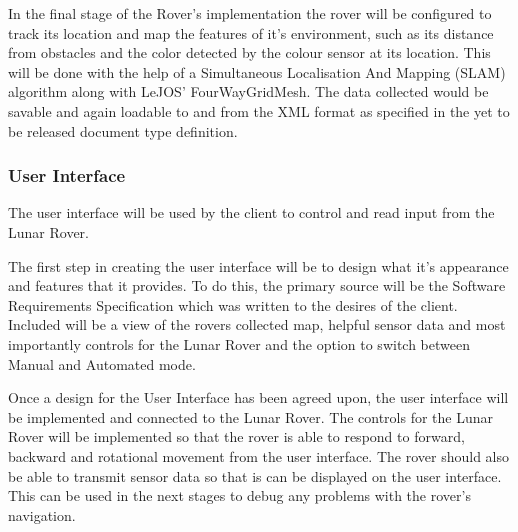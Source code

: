 \documentclass{article}
\newcounter{subsubsubsection}[subsubsection]
\begin{document}
    \begin{adjustwidth}{3em}{0pt}
    In the final stage of the Rover's implementation the rover will be configured to track its location and map the features of it's environment, such as its distance from obstacles and the color detected by the colour sensor at its location. This will be done with the help of a Simultaneous Localisation And Mapping (SLAM) algorithm along with LeJOS' FourWayGridMesh. The data collected would be savable and again loadable to and from the XML format as specified in the yet to be released document type definition. 
    \end{adjustwidth}
    
\subsubsection{User Interface}
\begin{adjustwidth}{2em}{0pt}
	The user interface will be used by the client to control and read input from the Lunar Rover.
	\end{adjustwidth}
    
    \begin{adjustwidth}{3em}{0pt}
    	The first step in creating the user interface will be to design what it's appearance and features that it provides. To do this, the primary source will be the Software Requirements Specification which was written to the desires of the client. Included will be a view of the rovers collected map, helpful sensor data and most importantly controls for the Lunar Rover and the option to switch between Manual and Automated mode.
    \end{adjustwidth}
    
    \begin{adjustwidth}{3em}{0pt}
    Once a design for the User Interface has been agreed upon, the user interface will be implemented and connected to the Lunar Rover. The controls for the Lunar Rover will be implemented so that the rover is able to respond to forward, backward and rotational movement from the user interface. The rover should also be able to transmit sensor data so that is can be displayed on the user interface. This can be used in the next stages to debug any problems with the rover's navigation.
    \end{adjustwidth}
    
\end{document}
